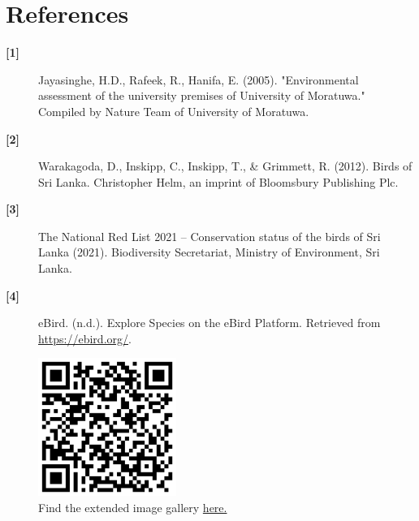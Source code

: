 \chapter{References}
\label{cp:References}

\begin{description}
    \item[\textbf{[1]}] Jayasinghe, H.D., Rafeek, R., Hanifa, E. (2005). "Environmental assessment of the university premises of University of Moratuwa." Compiled by Nature Team of University of Moratuwa.
    \\
    \item[\textbf{[2]}] Warakagoda, D., Inskipp, C., Inskipp, T., \& Grimmett, R. (2012). Birds of Sri Lanka. Christopher Helm, an imprint of Bloomsbury Publishing Plc.
    \\
    \item[\textbf{[3]}] The National Red List 2021 – Conservation status of the birds of Sri Lanka (2021). Biodiversity Secretariat, Ministry of Environment, Sri Lanka.
    \\
    \item[\textbf{[4]}] eBird. (n.d.). Explore Species on the eBird Platform. Retrieved from \url{https://ebird.org/}.
\end{description}

\begin{figure}[!htpb]
    \centering
    \includegraphics[width=0.4\textwidth]{Figures/QR.png}
    \caption[]{Find the extended image gallery \href{https://chathura-de-silva.github.io/Mora-Bird-Diversity/}{here.}}
    \label{fig:figure-01}
\end{figure}